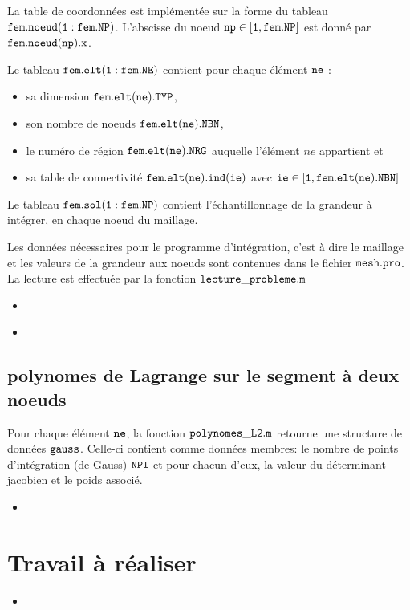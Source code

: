 \documentclass[a4paper, 10pt]{article}
\newcommand{\matlabscript}[2]
  {\begin{itemize}\item[]\end{itemize}}
\begin{document}
La table de coordonnées est implémentée sur la forme du tableau $ \tt{fem.noeud(1:fem.NP)} \rm$.
L'abscisse du noeud $\tt{np \in [1,   fem.NP \rm]}$ est donné par $ \tt{fem.noeud(np).x} \rm$. 

Le tableau $\tt{fem.elt(1:fem.NE)} \rm$ contient pour chaque élément $ \tt{ne}\rm$ :

\begin{itemize}
\renewcommand\labelitemi{\textbullet}
\item sa dimension $\tt{fem.elt(ne).TYP} \rm$,
\item  son nombre de noeuds $\tt{fem.elt(ne).NBN} \rm$,
\item le numéro de région $\tt{fem.elt(ne).NRG} \rm$ auquelle l'élément $ne$ appartient  et
\item  sa table de connectivité $\tt{fem.elt(ne).ind(ie)} \rm$ avec $\tt{ie \in [1,   fem.elt(ne).NBN \rm]}$
\end{itemize} 

Le tableau $\tt{fem.sol(1:fem.NP)} \rm$ contient l'échantillonnage de la grandeur à intégrer, en chaque noeud
du maillage.

Les données nécessaires pour le programme d'intégration, c'est à dire le maillage et les valeurs de la grandeur aux noeuds sont contenues dans le fichier $\tt{mesh.pro} \rm$. La lecture est effectuée par la fonction
$\tt{lecture\_probleme.m} \rm$

\matlabscript{lecture_probleme}{lecture des données du problème}

\matlabscript{mesh.pro}{fichier 'mesh.pro'}

\subsection {polynomes de Lagrange sur le segment à deux noeuds}

Pour chaque élément $\tt{ne} \rm$, la fonction $\tt{polynomes\_L2.m} \rm$ retourne une structure
de données $\tt{gauss} \rm$. Celle-ci contient comme données membres: le nombre de points d'intégration
(de Gauss) $\tt{NPI} \rm$ et pour chacun d'eux, la valeur du déterminant jacobien et le poids associé.

\matlabscript{polynomes_L2}{polynomes de Lagrange}

\section {Travail à réaliser}

\matlabscript{integrale}{integrale élémentaire}
\end{document}
